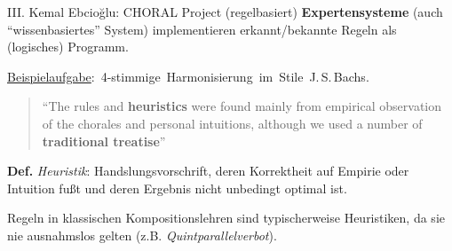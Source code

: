 \begin{frame}{III. \dimThreeTitle}{Kemal Ebcio\u{g}lu: CHORAL Project (regelbasiert)}
	\textbf{Expertensysteme} (auch \enquote{wissenbasiertes} System) implementieren erkannt/bekannte Regeln als (logisches) Programm.
	\medskip
	
	\vspace{-.5cm}
	\mbox{\underline{Beispielaufgabe}: 4-stimmige Harmonisierung im Stile J.\,S.\,Bachs. }
	\medskip
	
	\begin{quote}
	\enquote{The rules and \textbf{heuristics} were found mainly from empirical observation of the
		chorales and personal intuitions, although we used a number of \textbf{traditional treatise}} {\footnotesize\citep[S.73]{CHORAL_report}}\\
	\end{quote}
	{\color{TUDoGreen}\textbf{Def.}} \emph{Heuristik}: Handslungsvorschrift, deren Korrektheit auf Empirie oder Intuition fußt und deren Ergebnis nicht unbedingt optimal ist.
	\medskip
	
	Regeln in klassischen Kompositionslehren sind typischerweise Heuristiken, da sie nie ausnahmslos gelten (z.B. \emph{Quintparallelverbot}).
\end{frame}
